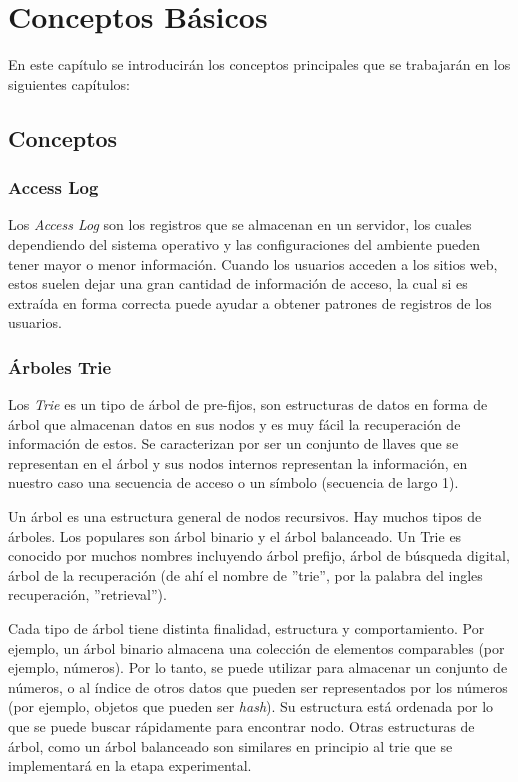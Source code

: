 \chapter[Conceptos Básicos]{Conceptos Básicos}
\label{ch:Conceptos-Basicos}





En este capítulo se introducirán los conceptos principales que se trabajarán en los siguientes capítulos:


\section{Conceptos}

\subsection{Access Log}

Los \emph{Access Log} son los registros que se almacenan en un servidor, los cuales dependiendo del sistema operativo y las configuraciones del ambiente pueden tener mayor o menor información. Cuando los usuarios acceden a los sitios web, estos  suelen dejar una gran cantidad de información de acceso, la cual si es extraída en forma correcta puede ayudar a obtener patrones de registros de los usuarios. 


\subsection{Árboles Trie}

Los \emph{Trie} es un tipo de árbol de pre-fijos, son estructuras de datos en forma de árbol que almacenan datos en sus nodos y es muy fácil la recuperación de información de estos. Se caracterizan por ser un conjunto de llaves que se representan en el árbol y sus nodos internos representan la información, en nuestro caso una secuencia de acceso o un símbolo (secuencia de largo 1). 

Un árbol es una estructura general de nodos recursivos. Hay muchos tipos de árboles. Los populares son árbol binario y el árbol balanceado. Un Trie es conocido por muchos nombres incluyendo árbol prefijo, árbol de búsqueda digital, árbol de la recuperación (de ahí el nombre de ''trie'', por la palabra del ingles recuperación, ''retrieval'').

Cada tipo de árbol tiene distinta finalidad, estructura y comportamiento. Por ejemplo, un árbol binario almacena una colección de elementos comparables (por ejemplo, números). Por lo tanto, se puede utilizar para almacenar un conjunto de números, o al índice de otros datos que pueden ser representados por los números (por ejemplo, objetos que pueden ser \emph{hash}). Su estructura está ordenada por lo que se puede buscar rápidamente para encontrar nodo. Otras estructuras de árbol, como un árbol balanceado son similares en principio al trie que se implementará en la etapa experimental.

